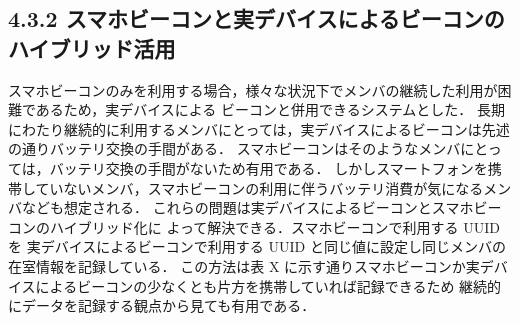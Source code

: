 \subsection*{4.3.2 スマホビーコンと実デバイスによるビーコンのハイブリッド活用}
スマホビーコンのみを利用する場合，様々な状況下でメンバの継続した利用が困難であるため，実デバイスによる
ビーコンと併用できるシステムとした．
長期にわたり継続的に利用するメンバにとっては，実デバイスによるビーコンは先述の通りバッテリ交換の手間がある．
スマホビーコンはそのようなメンバにとっては，バッテリ交換の手間がないため有用である．
しかしスマートフォンを携帯していないメンバ，スマホビーコンの利用に伴うバッテリ消費が気になるメンバなども想定される．
これらの問題は実デバイスによるビーコンとスマホビーコンのハイブリッド化に
よって解決できる．スマホビーコンで利用する UUID を
実デバイスによるビーコンで利用する UUID と同じ値に設定し同じメンバの在室情報を記録している．
この方法は表      X        に示す通りスマホビーコンか実デバイスによるビーコンの少なくとも片方を携帯していれば記録できるため
継続的にデータを記録する観点から見ても有用である．





